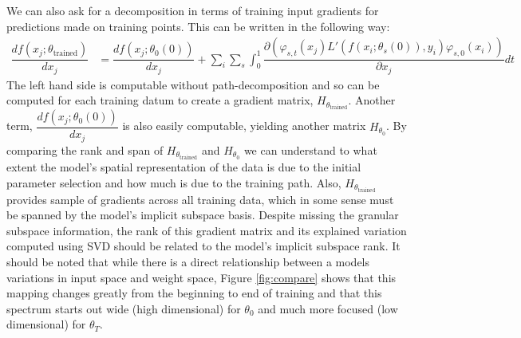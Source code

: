 We can also ask for a decomposition in terms of training input gradients for predictions made on training points. This can be written in the following way:
\begin{align}
    \dfrac{df(x_j; \theta_\text{trained})}{dx_j} &= \dfrac{df(x_j; \theta_0(0))}{dx_j} + \sum_i \sum_s \int_0^1 \dfrac{\partial\left(\varphi_{s,t}(x_j) L'(f(x_i; \theta_s(0)), y_i) \varphi_{s, 0}(x_i)\right)}{\partial x_j} dt
\end{align}
The left hand side is computable without path-decomposition and so can be computed for each training datum to create a gradient matrix, $H_{\theta_\text{trained}}$. Another term, $\dfrac{df(x_j; \theta_0(0))}{dx_j}$ is also easily computable, yielding another matrix $H_{\theta_0}$. By comparing the rank and span of $H_{\theta_\text{trained}}$ and $H_{\theta_0}$ we can understand to what extent the model's spatial representation of the data is due to the initial parameter selection and how much is due to the training path. Also, $H_{\theta_\text{trained}}$ provides sample of gradients across all training data, which in some sense must be spanned by the model's implicit subspace basis. Despite missing the granular subspace information, the rank of this gradient matrix and its explained variation computed using SVD should be related to the model's implicit subspace rank. 
It should be noted that while there is a direct relationship between a models variations in input space and weight space, Figure \ref{fig:compare} shows that this mapping changes greatly from the beginning to end of training and that this spectrum starts out wide (high dimensional) for $\theta_0$ and much more focused (low dimensional) for $\theta_T$. 


%


